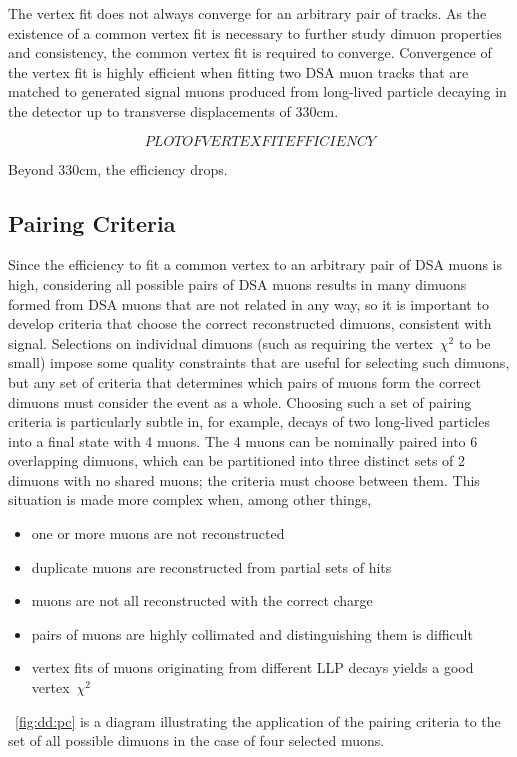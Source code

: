 The vertex fit does not always converge for an arbitrary pair of tracks.
As the existence of a common vertex fit is necessary to further study dimuon properties and consistency, the common vertex fit is required to converge.
Convergence of the vertex fit is highly efficient when fitting two DSA muon tracks that are matched to generated signal muons produced from long-lived particle decaying in the detector up to transverse displacements of 330\unit{cm}.

$$PLOT OF VERTEX FIT EFFICIENCY$$

Beyond 330\unit{cm}, the efficiency drops.

\subsection{Pairing Criteria}
\label{sec:dd:pc}
Since the efficiency to fit a common vertex to an arbitrary pair of DSA muons is high, considering all possible pairs of DSA muons results in many dimuons formed from DSA muons that are not related in any way, so it is important to develop criteria that choose the correct reconstructed dimuons, consistent with signal.
Selections on individual dimuons (such as requiring the vertex~$\chi^2$ to be small) impose some quality constraints that are useful for selecting such dimuons, but any set of criteria that determines which pairs of muons form the correct dimuons must consider the event as a whole.
Choosing such a set of pairing criteria is particularly subtle in, for example, decays of two long-lived particles into a final state with 4 muons.
The 4 muons can be nominally paired into 6 overlapping dimuons, which can be partitioned into three distinct sets of 2 dimuons with no shared muons; the criteria must choose between them.
This situation is made more complex when, among other things,
\begin{itemize}
  \item one or more muons are not reconstructed
  \item duplicate muons are reconstructed from partial sets of hits
  \item muons are not all reconstructed with the correct charge
  \item pairs of muons are highly collimated and distinguishing them is difficult
  \item vertex fits of muons originating from different LLP decays yields a good vertex~$\chi^2$
\end{itemize}
\Fig~\ref{fig:dd:pc} is a diagram illustrating the application of the pairing criteria to the set of all possible dimuons in the case of four selected muons.

